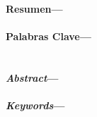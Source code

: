 \begin{titlepage}
\
\vfill
\vfill
\begin{flushright}
\end{flushright}
\begin{flushright}
\noindent \dedicatoria
\end{flushright}
\vfill
\end{titlepage}
\begin{titlepage}
\begin{center}
\end{center}
\agradecimientos
\vfill
\end{titlepage}
\begin{titlepage}
\vspace{0.3cm}
\noindent \textbf{Resumen---}\resumen \ \\
\vspace{0.3cm} \\
\noindent \textbf{Palabras Clave---}\palabrasclave \ \\
\vspace{1.2cm} \\
\vspace{1.2cm} \\
\noindent \textbf{\emph{Abstract}---}\resumeningles \ \\
\vspace{0.3cm} \\
\noindent \textbf{\emph{Keywords}---}\palabrasclaveingles \ \\
\end{titlepage}
